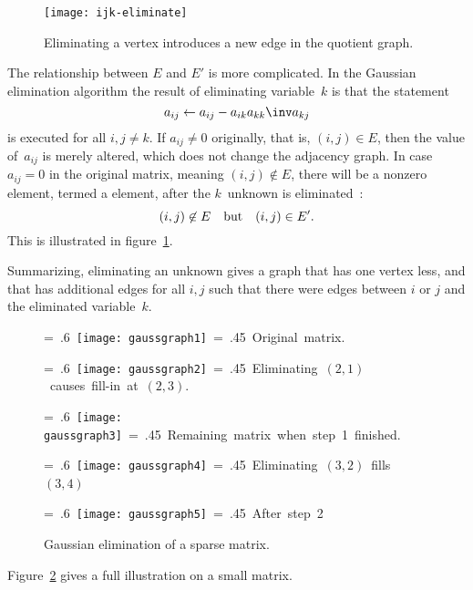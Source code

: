 \begin{figure}[ht]
  \texttt{[image: ijk-eliminate]}
  \caption{Eliminating a vertex introduces a new edge in the quotient
    graph.}
  \label{fig:ijk-eliminate}
\end{figure}
The relationship between $E$ and $E'$ is more complicated. In the
Gaussian elimination algorithm the result of eliminating variable~$k$ is
that the statement
\[ a_{ij} \leftarrow a_{ij}- a_{ik}a_{kk}\inv a_{kj} \]
is executed for all $i,j\not=k$. If $a_{ij}\not=0$ originally, that
is, $(i,j)\in E$,
then
the value of~$a_{ij}$ is merely altered,
which does not change the adjacency graph.
In case $a_{ij}=0$  in the original matrix,
meaning $(i,j)\not\in E$,
there will be a nonzero element, termed a 
element,
after the $k$~unknown
is eliminated~\cite{Pa:graph}:
\[ (i,j)\not\in E\quad\hbox{but}\quad (i,j)\in E'. \] 
This is illustrated in figure~\ref{fig:ijk-eliminate}.

Summarizing, eliminating an unknown gives a graph that has one vertex
less, and that has additional edges for all $i,j$ such that there were edges
between $i$ or $j$ and the eliminated variable~$k$.

\begin{figure}[p]
  \def\magfact{.45}

  \hbox{\vbox{\hsize= .6\textwidth
      \texttt{[image: gaussgraph1]}
    }\vbox{\hsize= \magfact\textwidth
      Original matrix.
  }}\medskip

  \hbox{\vbox{\hsize= .6\textwidth
      \texttt{[image: gaussgraph2]}
    }\vbox{\hsize= \magfact\textwidth
      Eliminating $(2,1)$ causes fill-in at $(2,3)$.
  }}\medskip

  \hbox{\vbox{\hsize= .6\textwidth
      \texttt{[image: gaussgraph3]}
    }\vbox{\hsize= \magfact\textwidth
      Remaining matrix when step~1 finished.
  }}\medskip

  \hbox{\vbox{\hsize= .6\textwidth
      \texttt{[image: gaussgraph4]}
    }\vbox{\hsize= \magfact\textwidth
      Eliminating $(3,2)$ fills $(3,4)$
  }}\medskip

  \hbox{\vbox{\hsize= .6\textwidth
      \texttt{[image: gaussgraph5]}
    }\vbox{\hsize= \magfact\textwidth
      After step~2
  }}
  
  \caption{Gaussian elimination of a sparse matrix.}
  \label{fig:sparseLU4x4}  
\end{figure}

Figure~\ref{fig:sparseLU4x4} gives a full illustration
on a small matrix.


